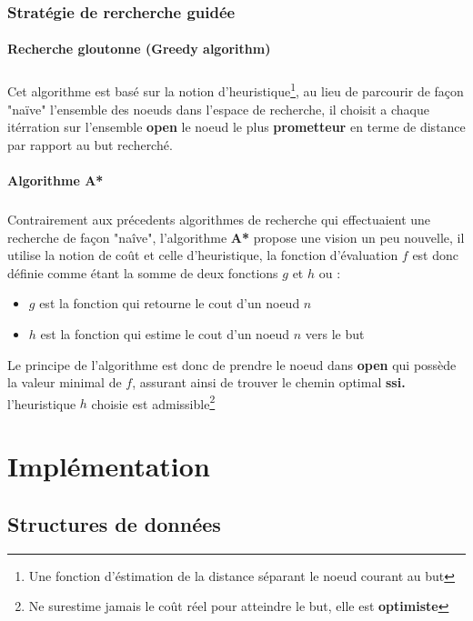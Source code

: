 \documentclass[12pt]{report}
\begin{document}
\subsection
{Stratégie de rercherche guidée}
\subsubsection{Recherche gloutonne (Greedy algorithm)}
\paragraph{}
Cet algorithme est basé sur la notion d'heuristique\footnote[1]{Une fonction d'éstimation de la distance séparant le noeud courant au but }, au lieu de parcourir de façon "naïve" l'ensemble des noeuds dans l'espace de recherche, il choisit a chaque itérration sur l'ensemble \textbf{open} le noeud le plus \textbf{prometteur} en terme de distance par rapport au but recherché.
\newpage
\subsubsection{Algorithme A*}
\paragraph{}
Contrairement aux précedents algorithmes de recherche qui effectuaient une recherche de façon "naîve", l'algorithme \textbf{A* }propose une vision un peu nouvelle, il utilise la notion de coût et celle d'heuristique, la fonction d'évaluation $f$ est donc définie comme étant la somme de deux fonctions $g$ et $h$ ou : \\
	\begin{itemize}
		\item $g$ est la fonction  qui retourne le cout d'un noeud $n$
		\item $h$ est la fonction  qui estime le cout d'un noeud $n$ vers le but
	\end{itemize} 
Le principe de l'algorithme est donc de prendre le noeud dans \textbf{open} qui possède la valeur minimal de $f$, assurant ainsi de trouver le chemin optimal \textbf{ssi.} l'heuristique $h$ choisie est admissible\footnote[2]{Ne surestime jamais le coût réel pour atteindre le but, elle est \textbf{optimiste}}


\newpage
\chapter{Implémentation}
\section{Structures de données}
\end{document}
